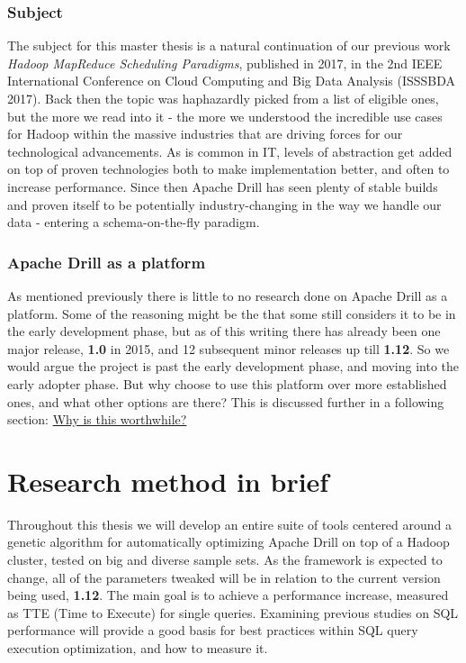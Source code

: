 \documentclass[a4paper,english]{report}
\begin{document}
			\subsubsection{Subject}
			The subject for this master thesis is a natural continuation of our previous work \emph{Hadoop MapReduce Scheduling Paradigms}, published in 2017, in the 2nd IEEE International Conference on Cloud Computing and Big Data Analysis (ISSSBDA 2017). Back then the topic was haphazardly picked from a list of eligible ones, but the more we read into it - the more we understood the incredible use cases for Hadoop within the massive industries that are driving forces for our technological advancements. As is common in IT, levels of abstraction get added on top of proven technologies both to make implementation better, and often to increase performance. Since then Apache Drill has seen plenty of stable builds and proven itself to be potentially industry-changing in the way we handle our data - entering a schema-on-the-fly paradigm.
			\subsubsection{Apache Drill as a platform}
			As mentioned previously there is little to no research done on Apache Drill as a platform. Some of the reasoning might be the that some still considers it to be in the early development phase, but as of this writing there has already been one major release, \textbf{1.0} in 2015, and 12 subsequent minor releases up till \textbf{1.12}.\cite{drill_releases} So we would argue the project is past the early development phase, and moving into the early adopter phase. But why choose to use this platform over more established ones, and what other options are there? This is discussed further in a following section: \hyperref[sec:why_drill]{Why is this worthwhile?}
		
		\section{Research method in brief}
		Throughout this thesis we will develop an entire suite of tools centered around a genetic algorithm for automatically optimizing Apache Drill on top of a Hadoop cluster, tested on big and diverse sample sets. As the framework is expected to change, all of the parameters tweaked will be in relation to the current version being used, \textbf{1.12}. The main goal is to achieve a performance increase, measured as TTE (Time to Execute) for single queries. Examining previous studies on SQL performance will provide a good basis for best practices within SQL query execution optimization, and how to measure it.
		
\end{document}
